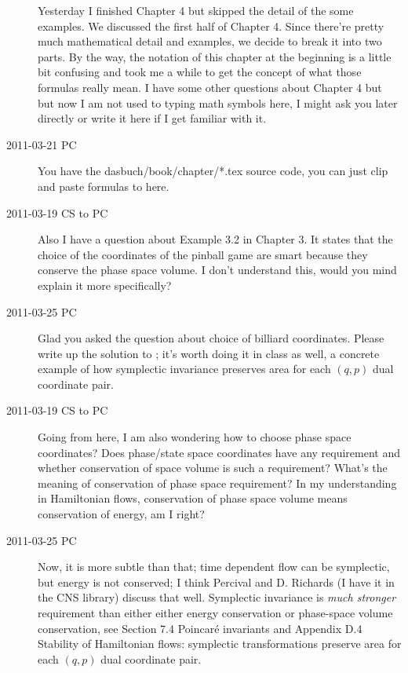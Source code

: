\begin{description}
   Yesterday I finished Chapter 4 but skipped the detail of the some
   examples. We discussed the first half of Chapter 4. Since there're
   pretty much mathematical detail and examples, we decide to break it
   into two parts. By the way, the notation of this chapter at the
   beginning is a little bit confusing and took me a while to get the
   concept of what those formulas really mean. I have some other
   questions about Chapter 4 but but now I am not used to typing math
   symbols here, I might ask you later directly or write it here if I get
   familiar with it.

\item[2011-03-21 PC] You have the dasbuch/book/chapter/*.tex source
code, you can just clip and paste formulas to here.

\item[2011-03-19 CS to PC]
Also I have a question about Example 3.2 in Chapter 3. It states that
   the choice of the coordinates of the pinball game are smart because
   they conserve the phase space volume. I don't understand this, would
   you mind explain it more specifically? 

\item[2011-03-25 PC]
Glad you asked the question about choice of billiard coordinates. Please write up the solution to ; it's worth doing it in class as well, a concrete example of how symplectic invariance preserves area for each $(q,p)$ dual coordinate  pair.

\item[2011-03-19 CS to PC]
Going from here, I am also
   wondering how to choose phase space coordinates? Does phase/state
   space coordinates have any requirement and whether conservation of
   space volume is such a requirement? What's the meaning of conservation
   of phase space requirement? In my understanding in Hamiltonian flows,
   conservation of phase space volume means conservation of energy, am I
   right?


\item[2011-03-25 PC]
Now, it is more subtle than that; time dependent flow can be symplectic, but energy is not conserved; I think Percival and D. Richards (I have it in the
 {CNS library}) discuss that well. Symplectic invariance is \emph{much stronger} requirement than either either energy conservation or phase-space volume conservation, see 
 {Section 7.4 Poincar\'e invariants} and 
{Appendix D.4 Stability of Hamiltonian flows}: 
symplectic transformations preserve area for each $(q,p)$ dual coordinate  pair.


\end{description}
